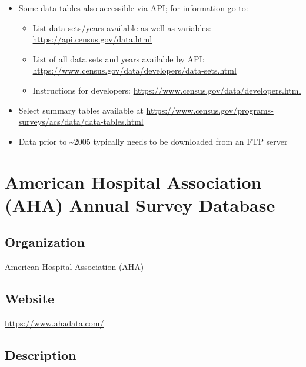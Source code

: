 \documentclass[
]{book}
\providecommand{\tightlist}{%
  \setlength{\itemsep}{0pt}\setlength{\parskip}{0pt}}
\begin{document}
\begin{itemize}
\tightlist
\item
  Some data tables also accessible via API; for information go to:

  \begin{itemize}
  \tightlist
  \item
    List data sets/years available as well as variables: \url{https://api.census.gov/data.html}
  \item
    List of all data sets and years available by API: \url{https://www.census.gov/data/developers/data-sets.html}
  \item
    Instructions for developers: \url{https://www.census.gov/data/developers.html}
  \end{itemize}
\item
  Select summary tables available at \url{https://www.census.gov/programs-surveys/acs/data/data-tables.html}
\item
  Data prior to \textasciitilde2005 typically needs to be downloaded from an FTP server
\end{itemize}

\mainmatter

\hypertarget{american-hospital-association-aha-annual-survey-database}{%
\chapter{American Hospital Association (AHA) Annual Survey Database}\label{american-hospital-association-aha-annual-survey-database}}

\hypertarget{organization-5}{%
\section{Organization}\label{organization-5}}

American Hospital Association (AHA)

\hypertarget{website-5}{%
\section{Website}\label{website-5}}

\url{https://www.ahadata.com/}

\hypertarget{description-5}{%
\section{Description}\label{description-5}}
\end{document}
